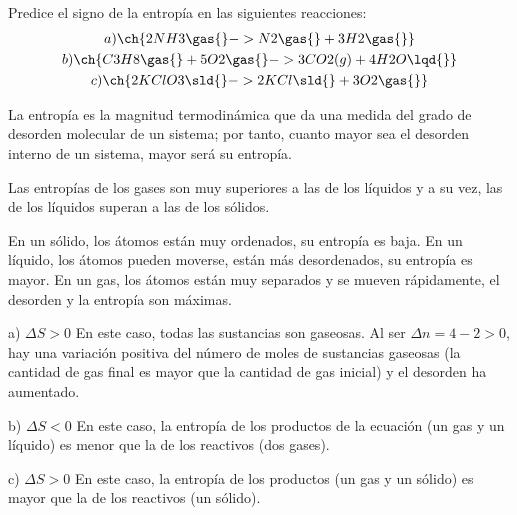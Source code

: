 \begin{exercise}
    Predice el signo de la entropía en las siguientes reacciones:
    \begin{gather*}
        a) \ch{2 NH3 \gas{} -> N2 \gas{} + 3 H2 \gas{}} \\
        b) \ch{C3H8 \gas{} + 5 O2 \gas{} -> 3 CO2 (g) + 4 H2O \lqd{}} \\
        c) \ch{2 KClO3 \sld{} -> 2 KCl \sld{} + 3 O2 \gas{}}
    \end{gather*}


    \begin{solu}

        La entropía es la magnitud termodinámica que da una medida del grado de desorden molecular
        de un sistema; por tanto, cuanto mayor sea el desorden interno de un sistema, mayor será su
        entropía.

        Las entropías de los gases son muy superiores a las de los líquidos y a su vez, las de los líquidos
        superan a las de los sólidos.

        En un sólido, los átomos están muy ordenados, su entropía es baja. En un líquido, los átomos
        pueden moverse, están más desordenados, su entropía es mayor. En un gas, los átomos están
        muy separados y se mueven rápidamente, el desorden y la entropía son máximas.

        a) \(\Delta S > 0\) En este caso, todas las sustancias son gaseosas. Al ser \(\Delta n = 4-2 > 0\), hay una variación positiva del número de moles de sustancias gaseosas (la cantidad de gas final es mayor
        que la cantidad de gas inicial) y el desorden ha aumentado.

        b) \(\Delta S < 0\) En este caso, la entropía de los productos de la ecuación (un gas y un líquido) es
        menor que la de los reactivos (dos gases).

        c) \(\Delta S > 0\)  En este caso, la entropía de los productos (un gas y un sólido) es mayor que la de
        los reactivos (un sólido).

    \end{solu}
\end{exercise}
